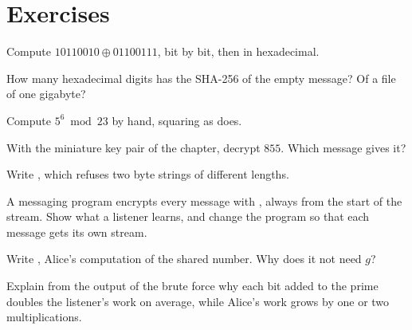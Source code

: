 \section{Exercises}\label{sec:g12:secure-communication:exercises}

\begin{exercise}[$\star$]\label{exo:g12:secure-communication:1}
Compute $10110010 \oplus 01100111$, bit by bit, then in hexadecimal.
\end{exercise}

\begin{exercise}[$\star$]\label{exo:g12:secure-communication:2}
How many hexadecimal digits has the SHA-256  of the empty message? Of a file of one gigabyte?
\end{exercise}

\begin{exercise}[$\star$]\label{exo:g12:secure-communication:3}
Compute $5^6 \bmod 23$ by hand, squaring as  does.
\end{exercise}

\begin{exercise}[$\star$]\label{exo:g12:secure-communication:4}
With the miniature key pair of the chapter, decrypt $855$. Which message gives it?
\end{exercise}

\begin{exercise}[$\star$]\label{exo:g12:secure-communication:5}
Write , which refuses two byte strings of different lengths.
\end{exercise}

\begin{exercise}[$\star\star$]\label{exo:g12:secure-communication:6}
A messaging program encrypts every message with , always from the start of the stream. Show
what a listener learns, and change the program so that each message gets its own stream.
\end{exercise}

\begin{exercise}[$\star\star$]\label{exo:g12:secure-communication:7}
Write , Alice's computation of the shared number. Why does it not need $g$?
\end{exercise}

\begin{exercise}[$\star\star$]\label{exo:g12:secure-communication:8}
Explain from the output of the brute force why each bit added to the prime doubles the listener's work on average,
while Alice's work grows by one or two multiplications.
\end{exercise}

